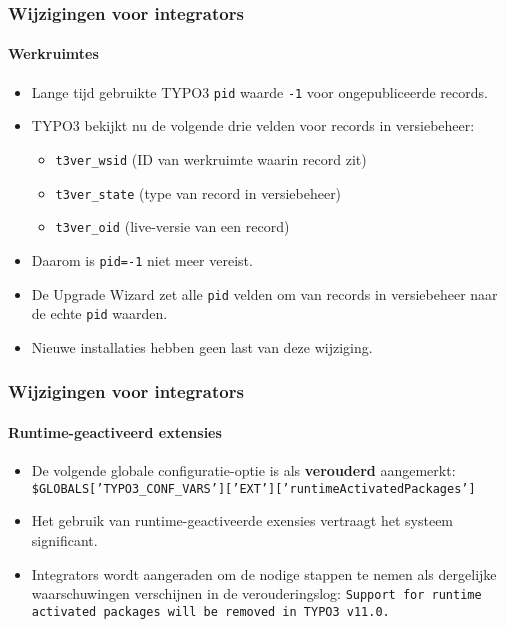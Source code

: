 \begin{frame}[fragile]
	\frametitle{Wijzigingen voor integrators}
	\framesubtitle{Werkruimtes}

	\begin{itemize}
		\item Lange tijd gebruikte TYPO3 \texttt{pid} waarde \texttt{-1} voor ongepubliceerde records.
		\item TYPO3 bekijkt nu de volgende drie velden voor records in versiebeheer:

			\begin{itemize}
				\item \texttt{t3ver\_wsid} (ID van werkruimte waarin record zit)
				\item \texttt{t3ver\_state} (type van record in versiebeheer)
				\item \texttt{t3ver\_oid} (live-versie van een record)
			\end{itemize}

		\item Daarom is \texttt{pid=-1} niet meer vereist.
		\item De Upgrade Wizard zet alle \texttt{pid} velden om van records in versiebeheer
			naar de echte \texttt{pid} waarden.
		\item Nieuwe installaties hebben geen last van deze wijziging.

	\end{itemize}

\end{frame}


\begin{frame}[fragile]
	\frametitle{Wijzigingen voor integrators}
	\framesubtitle{Runtime-geactiveerd extensies}

	\begin{itemize}
		\item De volgende globale configuratie-optie is als \textbf{verouderd} aangemerkt:\newline
			\smaller
				\texttt{\$GLOBALS['TYPO3\_CONF\_VARS']['EXT']['runtimeActivatedPackages']}
			\normalsize
		\item Het gebruik van runtime-geactiveerde exensies vertraagt het systeem significant.
		\item Integrators wordt aangeraden om de nodige stappen te nemen als dergelijke waarschuwingen
			verschijnen in de verouderingslog:\newline
			\begingroup
				\fontsize{8}{10}
				\texttt{Support for runtime activated packages will be removed in TYPO3 v11.0.}
			\endgroup

	\end{itemize}

\end{frame}

